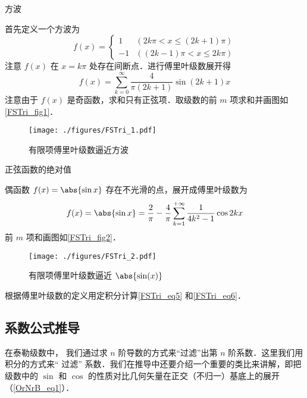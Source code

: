 \begin{example}{方波}

首先定义一个方波为
\begin{equation}
f(x) = 
\begin{cases}
1  & (2k\pi < x \leqslant (2k + 1)\pi) \\
- 1 &  ((2k - 1)\pi < x \leqslant 2k\pi)
\end{cases}
\end{equation}
注意 $f(x)$ 在 $x=k\pi$ 处存在间断点．进行傅里叶级数展开得
\begin{equation}\label{FSTri_eq5}
f(x) = \sum_{k = 0}^\infty \frac{4}{\pi (2k + 1)}\sin (2k + 1)x
\end{equation}
注意由于 $f(x)$ 是奇函数，求和只有正弦项．取级数的前 $m$ 项求和并画图如\autoref{FSTri_fig1}．

\begin{figure}[ht]
\centering
\texttt{[image: ./figures/FSTri\_1.pdf]}
\caption{有限项傅里叶级数逼近方波}\label{FSTri_fig1}
\end{figure}
\end{example}

\begin{example}{正弦函数的绝对值} %

偶函数 $f(x) = \abs{\sin x}$ 存在不光滑的点，展开成傅里叶级数为
\begin{equation}\label{FSTri_eq6}
f(x) = \abs{\sin x} = \frac{2}{\pi } - \frac{4}{\pi }\sum_{k = 1}^{+\infty} \frac{1}{4 k^2 - 1}\cos 2k x
\end{equation}
前 $m$ 项和画图如\autoref{FSTri_fig2}．
\begin{figure}[ht]
\centering
\texttt{[image: ./figures/FSTri\_2.pdf]}
\caption{有限项傅里叶级数逼近 $\abs{\sin(x)}$}\label{FSTri_fig2}
\end{figure}
\end{example}

\begin{exercise}{}
根据傅里叶级数的定义用定积分计算\autoref{FSTri_eq5} 和\autoref{FSTri_eq6}．
\end{exercise}


\subsection{系数公式推导}

在泰勒级数中，%
我们通过求 $n$ 阶导数的方式来“过滤”出第 $n$ 阶系数．这里我们用积分的方式来“ 过滤” 系数．我们在推导中还要介绍一个重要的类比来讲解，即把级数中的 $\sin$ 和 $\cos$ 的性质对比几何矢量在正交（不归一）基底上的展开（\autoref{OrNrB_eq1}）．

